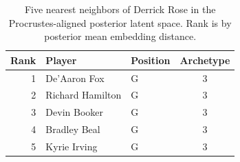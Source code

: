 \begin{table}[htbp]
  \centering\small
  \begin{tabular}{rllc}
    \toprule
    Rank & Player & Position & Archetype \\
    \midrule
    1 & De'Aaron Fox & G & 3 \\
    2 & Richard Hamilton & G & 3 \\
    3 & Devin Booker & G & 3 \\
    4 & Bradley Beal & G & 3 \\
    5 & Kyrie Irving & G & 3 \\
    \bottomrule
  \end{tabular}
  \caption{Five nearest neighbors of Derrick Rose in the Procrustes-aligned posterior latent space. Rank is by posterior mean embedding distance.}
  \label{tab:Derrick_Rose_neighbors}
\end{table}


